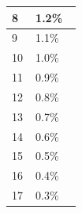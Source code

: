 \begin{longtable}{|>{\RaggedRight}p{0.32504\linewidth}|>{\RaggedRight}p{0.61782\linewidth}|}
\hspace*{0pt}\ignorespaces{}\hspace*{0pt}8&\hspace*{0pt}\ignorespaces{}\hspace*{0pt}1.2\%\\ \hline \hspace*{0pt}\ignorespaces{}\hspace*{0pt}9&\hspace*{0pt}\ignorespaces{}\hspace*{0pt}1.1\%\\ \hline \hspace*{0pt}\ignorespaces{}\hspace*{0pt}10&\hspace*{0pt}\ignorespaces{}\hspace*{0pt}1.0\%\\ \hline \hspace*{0pt}\ignorespaces{}\hspace*{0pt}11&\hspace*{0pt}\ignorespaces{}\hspace*{0pt}0.9\%\\ \hline \hspace*{0pt}\ignorespaces{}\hspace*{0pt}12&\hspace*{0pt}\ignorespaces{}\hspace*{0pt}0.8\%\\ \hline \hspace*{0pt}\ignorespaces{}\hspace*{0pt}13&\hspace*{0pt}\ignorespaces{}\hspace*{0pt}0.7\%\\ \hline \hspace*{0pt}\ignorespaces{}\hspace*{0pt}14&\hspace*{0pt}\ignorespaces{}\hspace*{0pt}0.6\%\\ \hline \hspace*{0pt}\ignorespaces{}\hspace*{0pt}15&\hspace*{0pt}\ignorespaces{}\hspace*{0pt}0.5\%\\ \hline \hspace*{0pt}\ignorespaces{}\hspace*{0pt}16&\hspace*{0pt}\ignorespaces{}\hspace*{0pt}0.4\%\\ \hline \hspace*{0pt}\ignorespaces{}\hspace*{0pt}17&\hspace*{0pt}\ignorespaces{}\hspace*{0pt}0.3\%\\ \hline 
\end{longtable}
